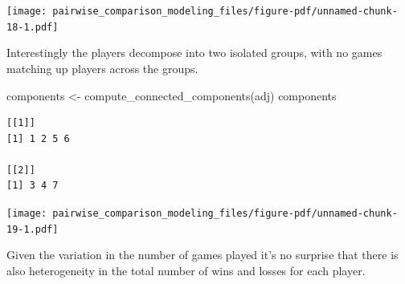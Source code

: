 \documentclass[
  letterpaper,
  DIV=11,
  numbers=noendperiod]{scrartcl}
\newenvironment{Shaded}{\begin{snugshade}}{\end{snugshade}}
\newcommand{\AttributeTok}[1]{\textcolor[rgb]{0.40,0.45,0.13}{#1}}
\newcommand{\ControlFlowTok}[1]{\textcolor[rgb]{0.00,0.23,0.31}{#1}}
\newcommand{\DecValTok}[1]{\textcolor[rgb]{0.68,0.00,0.00}{#1}}
\newcommand{\FunctionTok}[1]{\textcolor[rgb]{0.28,0.35,0.67}{#1}}
\newcommand{\NormalTok}[1]{\textcolor[rgb]{0.00,0.23,0.31}{#1}}
\newcommand{\OtherTok}[1]{\textcolor[rgb]{0.00,0.23,0.31}{#1}}
\newcommand{\SpecialCharTok}[1]{\textcolor[rgb]{0.37,0.37,0.37}{#1}}
\newcommand{\StringTok}[1]{\textcolor[rgb]{0.13,0.47,0.30}{#1}}
\begin{document}
\texttt{[image: pairwise\_comparison\_modeling\_files/figure-pdf/unnamed-chunk-18-1.pdf]}

Interestingly the players decompose into two isolated groups, with no
games matching up players across the groups.

\begin{Shaded}
\begin{Highlighting}[]
\NormalTok{components }\OtherTok{\textless{}{-}} \FunctionTok{compute\_connected\_components}\NormalTok{(adj)}
\NormalTok{components}
\end{Highlighting}
\end{Shaded}

\begin{verbatim}
[[1]]
[1] 1 2 5 6

[[2]]
[1] 3 4 7
\end{verbatim}

\begin{Shaded}
\end{Shaded}

\texttt{[image: pairwise\_comparison\_modeling\_files/figure-pdf/unnamed-chunk-19-1.pdf]}

Given the variation in the number of games played it's no surprise that
there is also heterogeneity in the total number of wins and losses for
each player.
\end{document}
